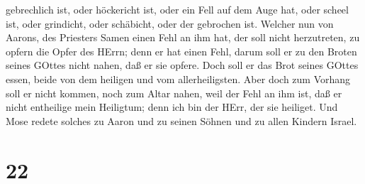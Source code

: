 gebrechlich ist,  oder höckericht ist, oder ein Fell auf
dem Auge hat, oder scheel ist, oder grindicht, oder schäbicht, oder der
gebrochen ist.  Welcher nun von Aarons, des Priesters Samen
einen Fehl an ihm hat, der soll nicht herzutreten, zu opfern die Opfer
des HErrn; denn er hat einen Fehl, darum soll er zu den Broten seines
GOttes nicht nahen, daß er sie opfere.  Doch soll er das
Brot seines GOttes essen, beide von dem heiligen und vom
allerheiligsten.  Aber doch zum Vorhang soll er nicht
kommen, noch zum Altar nahen, weil der Fehl an ihm ist, daß er nicht
entheilige mein Heiligtum; denn ich bin der HErr, der sie heiliget.
 Und Mose redete solches zu Aaron und zu seinen Söhnen und
zu allen Kindern Israel.

\hypertarget{section-21}{%
\section{22}\label{section-21}}

